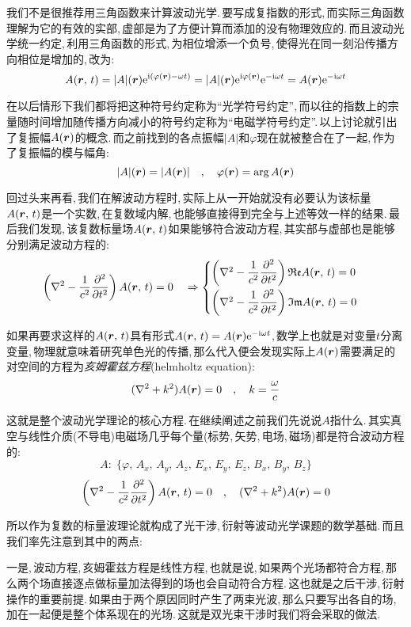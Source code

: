 我们不是很推荐用三角函数来计算波动光学.\,要写成复指数的形式,\,而实际三角函数理解为它的有效的实部,\,虚部是为了方便计算而添加的没有物理效应的.\,而且波动光学统一约定,\,利用三角函数的形式,\,为相位增添一个负号,\,使得光在同一刻沿传播方向相位是增加的,\,改为:
\[A(\boldsymbol{r},\,t)=|A|(\boldsymbol{r}){\rm e}^{{\rm i}(\varphi(\boldsymbol{r})-\omega t)}=|A|(\boldsymbol{r}){\rm e}^{{\rm i}\varphi(\boldsymbol{r})}{\rm e}^{-{\rm i}\omega t}=A(\boldsymbol{r}){\rm e}^{-{\rm i}\omega t}\]

在以后情形下我们都将把这种符号约定称为``光学符号约定'',\,而以往的指数上的宗量随时间增加随传播方向减小的符号约定称为``电磁学符号约定''.\,以上讨论就引出了复振幅$A(\boldsymbol{r})$的概念.\,而之前找到的各点振幅$|A|$和$\varphi$现在就被整合在了一起,\,作为了复振幅的模与幅角:
\[|A|(\boldsymbol{r})=|A(\boldsymbol{r})|\quad ,\quad \varphi(\boldsymbol{r})=\arg A(\boldsymbol{r})\]

回过头来再看,\,我们在解波动方程时,\,实际上从一开始就没有必要认为该标量$A(\boldsymbol{r},\,t)$是一个实数,\,在复数域内解,\,也能够直接得到完全与上述等效一样的结果.\,最后我们发现,\,该复数标量场$A(\boldsymbol{r},\,t)$如果能够符合波动方程,\,其实部与虚部也是能够分别满足波动方程的:
\[\left(\nabla^2 -\frac{1}{c^2}\frac{\partial^2}{\partial t^2}\right)A(\boldsymbol{r},\,t)=0\quad \Rightarrow \begin{cases}\left(\nabla^2 -\dfrac{1}{c^2}\dfrac{\partial^2}{\partial t^2}\right)\mathfrak{Re} A(\boldsymbol{r},\,t)=0 \\[8pt] \left(\nabla^2 -\dfrac{1}{c^2}\dfrac{\partial^2}{\partial t^2}\right)\mathfrak{Im}A(\boldsymbol{r},\,t)=0\end{cases}\]

如果再要求这样的$A(\boldsymbol{r},\,t)$具有形式$A(\boldsymbol{r},\,t)=A(\boldsymbol{r}){\rm e}^{-{\rm i}\omega t}$,\,数学上也就是对变量$t$分离变量,\,物理就意味着研究单色光的传播,\,那么代入便会发现实际上$A(\boldsymbol{r})$需要满足的对空间的方程为\emph{亥姆霍兹方程}(helmholtz equation):
\[(\nabla^2+k^2)A(\boldsymbol{r})=0\quad ,\quad k=\frac{\omega}{c}\]

这就是整个波动光学理论的核心方程.\,在继续阐述之前我们先说说$A$指什么.\,其实真空与线性介质(不导电)电磁场几乎每个量(标势,\,矢势,\,电场,\,磁场)都是符合波动方程的:
\[A:\;\{\varphi,\, A_x,\,A_y,\,A_z,\,E_x,\,E_y,\,E_z,\,B_x,\,B_y,\,B_z\}\]
\[\left(\nabla^2 -\frac{1}{c^2}\frac{\partial^2}{\partial t^2}\right)A(\boldsymbol{r},\,t)=0\quad,\quad (\nabla^2+k^2)A(\boldsymbol{r})=0\]

所以作为复数的标量波理论就构成了光干涉,\,衍射等波动光学课题的数学基础.\,而且我们率先注意到其中的两点:


一是,\,波动方程,\,亥姆霍兹方程是线性方程,\,也就是说,\,如果两个光场都符合方程,\,那么两个场直接逐点做标量加法得到的场也会自动符合方程.\,这也就是之后干涉,\,衍射操作的重要前提.\,如果由于两个原因同时产生了两束光波,\,那么只要写出各自的场,\,加在一起便是整个体系现在的光场.\,这就是双光束干涉时我们将会采取的做法.


